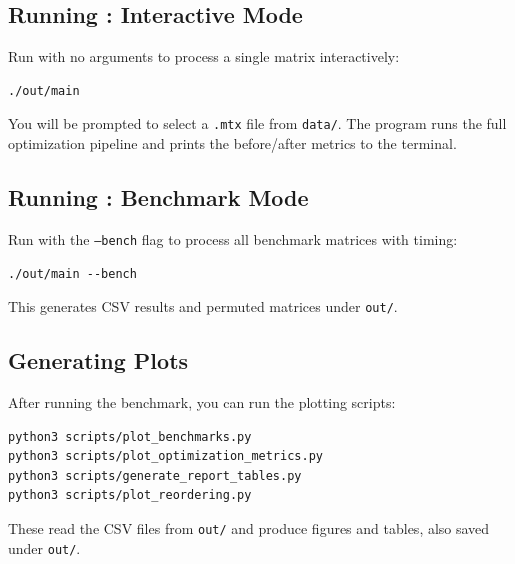 \documentclass[12pt]{article}
\begin{document}
\subsection*{Running : Interactive Mode}
Run with no arguments to process a single matrix interactively:
\begin{lstlisting}
./out/main
\end{lstlisting}
You will be prompted to select a \texttt{.mtx} file from \texttt{data/}. The program runs the full optimization pipeline and prints the before/after metrics to the terminal.

\subsection*{Running : Benchmark Mode}
Run with the \texttt{--bench} flag to process all benchmark matrices with timing:
\begin{lstlisting}
./out/main --bench
\end{lstlisting}
This generates CSV results and permuted matrices under \texttt{out/}.

\subsection*{Generating Plots}
After running the benchmark, you can run the plotting scripts:
\begin{lstlisting}
python3 scripts/plot_benchmarks.py
python3 scripts/plot_optimization_metrics.py
python3 scripts/generate_report_tables.py
python3 scripts/plot_reordering.py
\end{lstlisting}
These read the CSV files from \texttt{out/} and produce figures and tables, also saved under \texttt{out/}.
\end{document}
